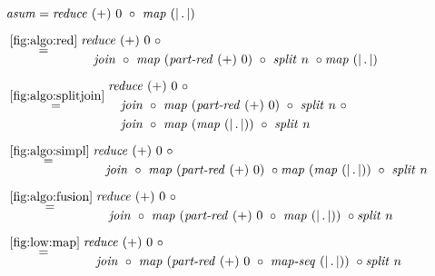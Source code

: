 \begin{figure*}[t]
\begin{align*}
  &\text{\textit{asum}} = \reduce\ (+)\ 0\ \circ\ \map\ (|\, .\, |)\\[.5em]
  &\begin{aligned}
  & \overset{\ref{fig:algo:red}}{\hspace{.2em}=\hspace{.2em}}
      \begin{aligned}
        & \reduce\ (+)\ 0\ \circ\\
        &\quad \join\ \circ\ \map\ (\partRed\ (+)\ 0)\ \circ\ \splitN\ n\ \circ \map\ (|\, .\, |)
      \end{aligned}\\[.5em]
  & \overset{\ref{fig:algo:splitjoin}}{=\hspace{.2em}}
      \begin{aligned}
        & \reduce\ (+)\ 0\ \circ\\
        &\quad \join\ \circ\ \map\ (\partRed\ (+)\ 0)\ \circ\ \splitN\ n\ \circ\\
        &\quad \join\ \circ\ \map\ (\map\ (|\, .\, |))\ \circ\ \splitN\ n
      \end{aligned}\\[.5em]
  & \overset{\ref{fig:algo:simpl}}{=\hspace{.2em}}
      \begin{aligned}
        & \reduce\ (+)\ 0\ \circ\\
        &\quad \join\ \circ\ \map\ (\partRed\ (+)\ 0)\ \circ \map\ (\map\ (|\, .\, |))\ \circ\ \splitN\ n
      \end{aligned}\\[.5em]
  & \overset{\ref{fig:algo:fusion}}{=\hspace{.2em}}
      \begin{aligned}
        & \reduce\ (+)\ 0\ \circ\\
        &\quad \join\ \circ\ \map\ (\partRed\ (+)\ 0\ \circ\ \map\ (|\, .\, |))\ \circ \splitN\ n
      \end{aligned}\\[.5em]
  & \overset{\ref{fig:low:map}}{=\hspace{.2em}}
      \begin{aligned}
        & \reduce\ (+)\ 0\ \circ\\
        &\quad \join\ \circ\ \map\ (\partRed\ (+)\ 0\ \circ\ \mapSeq\ (|\, .\, |))\ \circ \splitN\ n
      \end{aligned}\\[-1em]

\end{aligned}
\end{align*}
\end{figure*}
